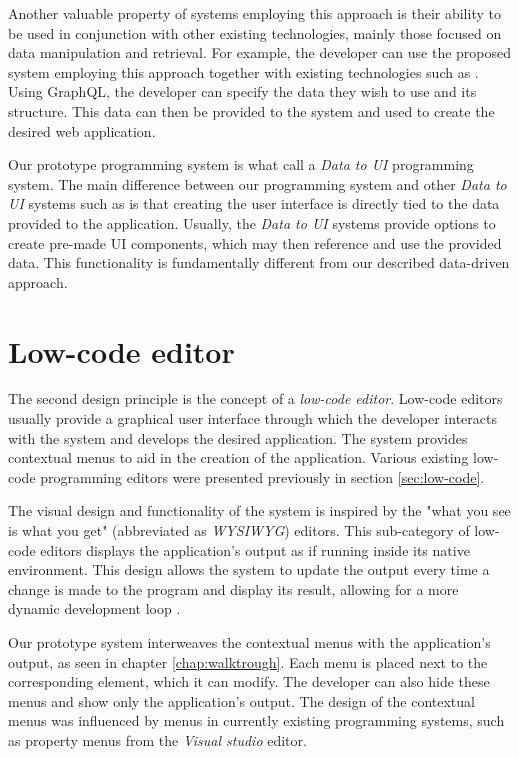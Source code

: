 Another valuable property of systems employing this approach is their ability to be used in conjunction with other existing technologies, mainly those focused on data manipulation and retrieval.
For example, the developer can use the proposed system employing this approach together with existing technologies such as \citet{graphql}.
Using GraphQL, the developer can specify the data they wish to use and its structure.
This data can then be provided to the system and used to create the desired web application.

Our prototype programming system is what \citet{Sahay_Indamutsa_Di} call a \emph{Data to UI} programming system.
The main difference between our programming system and other \emph{Data to UI} systems such as \citet{mendix} is that creating the user interface is directly tied to the data provided to the application.
Usually, the \emph{Data to UI} systems provide options to create pre-made UI components, which may then reference and use the provided data.
This functionality is fundamentally different from our described data-driven approach.

\section{Low-code editor}

The second design principle is the concept of a \emph{low-code editor}.
Low-code editors usually provide a graphical user interface through which the developer interacts with the system and develops the desired application.
The system provides contextual menus to aid in the creation of the application.
Various existing low-code programming editors were presented previously in section \ref{sec:low-code}.

The visual design and functionality of the system is inspired by the "what you see is what you get" (abbreviated as \emph{WYSIWYG}) editors\cite{Yang_Gupta_Botev_Churchill_Levchenko_Shanmugasundaram_2008}.
This sub-category of low-code editors displays the application's output as if running inside its native environment.
This design allows the system to update the output every time a change is made to the program and display its result, allowing for a more dynamic development loop \cite{output-directed-programming}.

Our prototype system interweaves the contextual menus with the application's output, as seen in chapter \ref{chap:walktrough}.
Each menu is placed next to the corresponding element, which it can modify.
The developer can also hide these menus and show only the application's output.
The design of the contextual menus was influenced by menus in currently existing programming systems, such as property menus from the \emph{Visual studio} editor.

